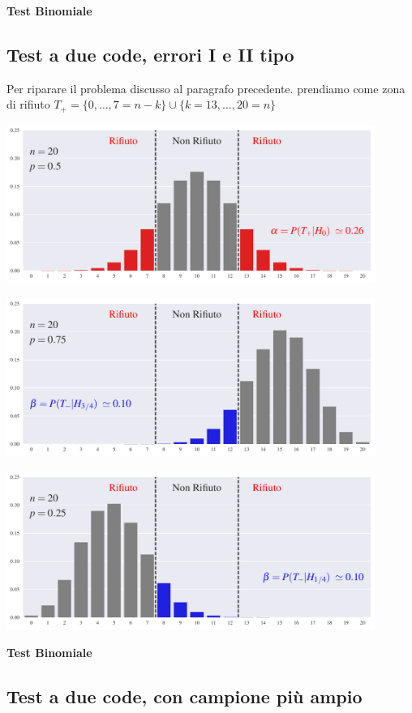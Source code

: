 \documentclass[12pt,openany]{book}
\theoremstyle{mio}
\theoremstyle{liscio}
\begin{document}
\hfill{}\clearpage\hfill\textbf{Test Binomiale}\subsection{Test a due code, errori I e II tipo}

Per riparare il problema discusso al paragrafo precedente. prendiamo come zona di rifiuto $T_+=\{0,\dots,7=n-k\}\cup \{k=13,\dots,20=n\}$

\hfil\includegraphics[width=0.9\textwidth]{figure/B-test_04.pdf}

\hfil\includegraphics[width=0.9\textwidth]{figure/B-test_05.pdf}

\hfil\includegraphics[width=0.9\textwidth]{figure/B-test_06.pdf}




\hfill{}\clearpage\hfill\textbf{Test Binomiale}
\subsection{Test a due code, con campione più ampio}
\end{document}
